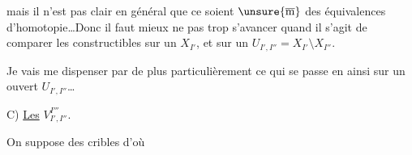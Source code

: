 \margin{$\Vert$}
mais il n'est pas clair en général que ce soient  $\unsure{\overline{\mathrm m}}$  des équivalences d'homotopie\dots Donc il faut mieux ne pas trop s'avancer quand il s'agit de comparer les constructibles sur un $X_{I'}$, et sur un $U_{I',I''}=X_{I'}\setminus X_{I''}$.

Je vais me dispenser par  de   plus particulièrement ce qui se passe en  ainsi sur un ouvert $U_{I',I''}$\dots

C) \uline{Les} $V^{I'''}_{I',I''}$.

On suppose  des cribles
d'où

